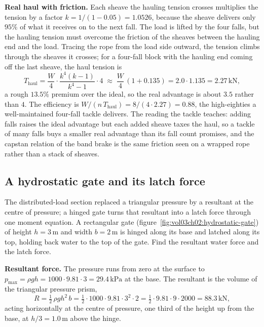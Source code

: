 \textbf{Real haul with friction.} Each sheave the hauling tension crosses
multiplies the tension by a factor $k = 1/(1 - 0.05) = 1.0526$, because the
sheave delivers only $95\%$ of what it receives on to the next fall. The
load is lifted by the four falls, but the hauling tension must overcome the
friction of the sheaves between the hauling end and the load. Tracing the
rope from the load side outward, the tension climbs through the sheaves it
crosses; for a four-fall block with the hauling end coming off the last
sheave, the haul tension is
\[
T_{\text{haul}} = \frac{W}{4}\cdot\frac{k^4 (k-1)}{k^4 - 1}\cdot 4
\;\approx\; \frac{W}{4}\,(1 + 0.135)
= 2.0\cdot 1.135 = 2.27\,\text{kN},
\]
a rough $13.5\%$ premium over the ideal, so the real advantage is about
$3.5$ rather than $4$. The efficiency is $W/(n\,T_{\text{haul}}) =
8/(4\cdot 2.27) = 0.88$, the high-eighties a well-maintained four-fall
tackle delivers. The reading the tackle teaches: adding falls raises the
ideal advantage but each added sheave taxes the haul, so a tackle of many
falls buys a smaller real advantage than its fall count promises, and the
capstan relation of the band brake is the same friction seen on a wrapped
rope rather than a stack of sheaves.

\subsection{A hydrostatic gate and its latch force}

The distributed-load section replaced a triangular pressure by a resultant
at the centre of pressure; a hinged gate turns that resultant into a latch
force through one moment equation. A rectangular gate
(figure~\ref{fig:vol03ch02:hydrostatic-gate}) of height $h = 3\,\si{\meter}$
and width $b = 2\,\si{\meter}$ is hinged along its base and latched along
its top, holding back water to the top of the gate. Find the resultant
water force and the latch force.

\textbf{Resultant force.} The pressure runs from zero at the surface to
$p_{\max} = \rho g h = 1000\cdot 9.81\cdot 3 = 29.4\,\text{kPa}$ at the
base. The resultant is the volume of the triangular pressure prism,
\[
R = \tfrac12\,\rho g h^2\,b
= \tfrac12\cdot 1000\cdot 9.81\cdot 3^2\cdot 2
= \tfrac12\cdot 9.81\cdot 9\cdot 2000
= 88.3\,\text{kN},
\]
acting horizontally at the centre of pressure, one third of the height up
from the base, at $h/3 = 1.0\,\si{\meter}$ above the hinge.

